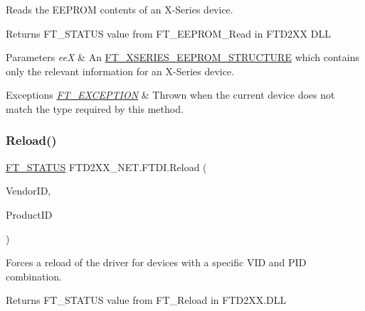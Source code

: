 Reads the E\+E\+P\+R\+OM contents of an X-\/\+Series device. 

\begin{DoxyReturn}{Returns}
F\+T\+\_\+\+S\+T\+A\+T\+US value from F\+T\+\_\+\+E\+E\+P\+R\+O\+M\+\_\+\+Read in F\+T\+D2\+XX D\+LL
\end{DoxyReturn}

\begin{DoxyParams}{Parameters}
{\em eeX} & An \mbox{\hyperlink{class_f_t_d2_x_x___n_e_t_1_1_f_t_d_i_1_1_f_t___x_s_e_r_i_e_s___e_e_p_r_o_m___s_t_r_u_c_t_u_r_e}{F\+T\+\_\+\+X\+S\+E\+R\+I\+E\+S\+\_\+\+E\+E\+P\+R\+O\+M\+\_\+\+S\+T\+R\+U\+C\+T\+U\+RE}} which contains only the relevant information for an X-\/\+Series device.\\
\hline
\end{DoxyParams}

\begin{DoxyExceptions}{Exceptions}
{\em \mbox{\hyperlink{class_f_t_d2_x_x___n_e_t_1_1_f_t_d_i_1_1_f_t___e_x_c_e_p_t_i_o_n}{F\+T\+\_\+\+E\+X\+C\+E\+P\+T\+I\+ON}}} & Thrown when the current device does not match the type required by this method.\\
\hline
\end{DoxyExceptions}
\mbox{\label{class_f_t_d2_x_x___n_e_t_1_1_f_t_d_i_ab95ea67e304fbd3fef1ddc64a5fb20df}} 
\subsubsection{\texorpdfstring{Reload()}{Reload()}}
{\footnotesize\ttfamily \mbox{\hyperlink{class_f_t_d2_x_x___n_e_t_1_1_f_t_d_i_aabe20ad905cc4ccc1e35dd5b877d9a83}{F\+T\+\_\+\+S\+T\+A\+T\+US}} F\+T\+D2\+X\+X\+\_\+\+N\+E\+T.\+F\+T\+D\+I.\+Reload (\begin{DoxyParamCaption}\item[{U\+Int16}]{Vendor\+ID,  }\item[{U\+Int16}]{Product\+ID }\end{DoxyParamCaption})}



Forces a reload of the driver for devices with a specific V\+ID and P\+ID combination. 

\begin{DoxyReturn}{Returns}
F\+T\+\_\+\+S\+T\+A\+T\+US value from F\+T\+\_\+\+Reload in F\+T\+D2\+X\+X.\+D\+LL
\end{DoxyReturn}


